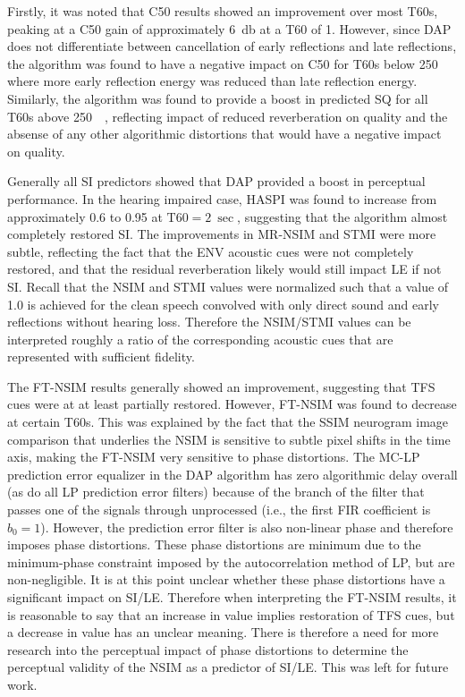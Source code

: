 Firstly, it was noted that C50 results showed an improvement over most T60s, peaking at a C50 gain of approximately \qty{6}{\decibel} at a T60 of \qty{1}{\sec}. However, since DAP does not differentiate between cancellation of early reflections and late reflections, the algorithm was found to have a negative impact on C50 for T60s below \qty{250}{\milli\sec} where more early reflection energy was reduced than late reflection energy. Similarly, the algorithm was found to provide a boost in predicted SQ for all T60s above \qty{250}{\milli\sec}, reflecting impact of reduced reverberation on quality and the absense of any other algorithmic distortions that would have a negative impact on quality.

Generally all SI predictors showed that DAP provided a boost in perceptual performance. In the hearing impaired case, HASPI was found to increase from approximately 0.6 to 0.95 at $\mathrm{T60} = \qty{2}{\sec}$, suggesting that the algorithm almost completely restored SI. The improvements in MR-NSIM and STMI were more subtle, reflecting the fact that the ENV acoustic cues were not completely restored, and that the residual reverberation likely would still impact LE if not SI. Recall that the NSIM and STMI values were normalized such that a value of 1.0 is achieved for the clean speech convolved with only direct sound and early reflections without hearing loss. Therefore the NSIM/STMI values can be interpreted roughly a ratio of the corresponding acoustic cues that are represented with sufficient fidelity. 

The FT-NSIM results generally showed an improvement, suggesting that TFS cues were at at least partially restored. However, FT-NSIM was found to decrease at certain T60s. This was explained by the fact that the SSIM neurogram image comparison that underlies the NSIM is sensitive to subtle pixel shifts in the time axis, making the FT-NSIM very sensitive to phase distortions. The MC-LP prediction error equalizer in the DAP algorithm has zero algorithmic delay overall (as do all LP prediction error filters) because of the branch of the filter that passes one of the signals through unprocessed (i.e., the first FIR coefficient is $b_0=1$). However, the prediction error filter is also non-linear phase and therefore imposes phase distortions. These phase distortions are minimum due to the minimum-phase constraint imposed by the autocorrelation method of LP, but are non-negligible. It is at this point unclear whether these phase distortions have a significant impact on SI/LE. Therefore when interpreting the FT-NSIM results, it is reasonable to say that an increase in value implies restoration of TFS cues, but a decrease in value has an unclear meaning. There is therefore a need for more research into the perceptual impact of phase distortions to determine the perceptual validity of the NSIM as a predictor of SI/LE. This was left for future work.

